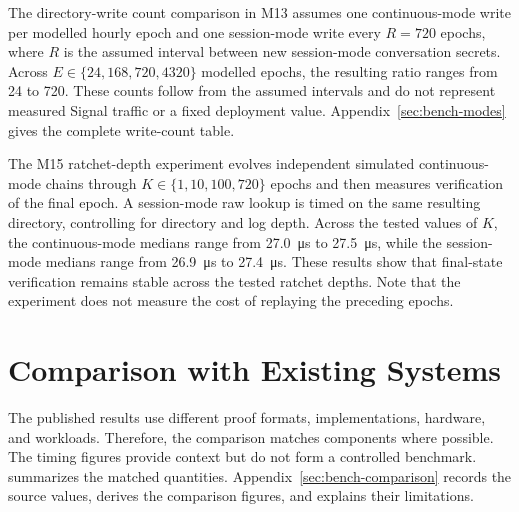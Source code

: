 The directory-write count comparison in M13 assumes one continuous-mode write per modelled hourly
epoch and one session-mode write every $R=720$ epochs, where $R$ is the assumed interval between
new session-mode conversation secrets. Across $E\in\{24,168,720,4320\}$ modelled epochs, the
resulting ratio ranges from 24 to
720. These counts follow from the assumed intervals and do not represent measured Signal traffic or
a fixed deployment value. Appendix~\ref{sec:bench-modes} gives the complete write-count table.

The M15 ratchet-depth experiment evolves independent simulated continuous-mode chains through
$K\in\{1,10,100,720\}$ epochs and then measures verification of the final epoch. A session-mode raw
lookup is timed on the same resulting directory, controlling for directory and log depth. Across
the tested values of $K$, the continuous-mode medians range from
\SI{27.0}{\micro\second} to \SI{27.5}{\micro\second}, while the session-mode medians range from
\SI{26.9}{\micro\second} to \SI{27.4}{\micro\second}. These results show that final-state
verification remains stable across the tested ratchet depths. Note that the experiment does not
measure the cost of replaying the preceding epochs.

\section{Comparison with Existing Systems}\label{sec:eval-compare}

The published results use different proof formats, implementations, hardware, and workloads.
Therefore, the comparison matches components where possible. The timing figures provide context but
do not form a controlled benchmark.  summarizes the matched quantities.
Appendix~\ref{sec:bench-comparison} records the source values, derives the comparison figures, and
explains their limitations.

